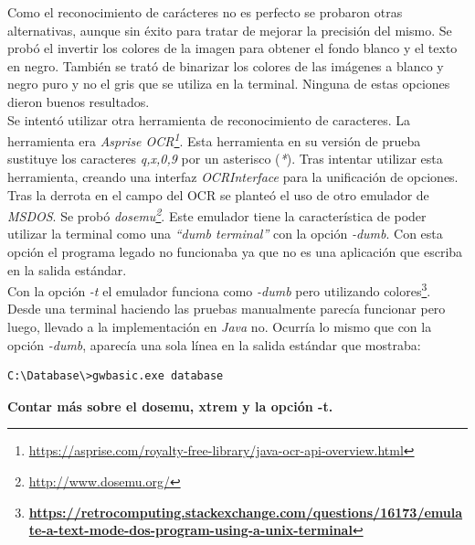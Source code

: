\documentclass[10pt,a4paper]{article}
\begin{document}
Como el reconocimiento de carácteres no es perfecto se probaron otras alternativas, aunque sin éxito para tratar de mejorar la precisión del mismo. Se probó el invertir los colores de la imagen para obtener el fondo blanco y el texto en negro. También se trató de binarizar los colores de las imágenes a blanco y negro puro y no el gris que se utiliza en la terminal. Ninguna de estas opciones dieron buenos resultados.\\
Se intentó utilizar otra herramienta de reconocimiento de caracteres. La herramienta era \emph{Asprise OCR\footnote{\url{https://asprise.com/royalty-free-library/java-ocr-api-overview.html}}}. Esta herramienta en su versión de prueba sustituye los caracteres \emph{q,x,0,9} por un asterisco (\emph{*}). Tras intentar utilizar esta herramienta, creando una interfaz \emph{OCRInterface} para la unificación de opciones.\\

Tras la derrota en el campo del OCR se planteó el uso de otro emulador de \emph{MSDOS}. Se probó \emph{dosemu\footnote{\url{http://www.dosemu.org/}}}. Este emulador tiene la característica de poder utilizar la terminal como una \emph{``dumb terminal''} con la opción \emph{-dumb}. Con esta opción el programa legado no funcionaba ya que no es una aplicación que escriba en la salida estándar.\\
Con la opción \emph{-t} el emulador funciona como \emph{-dumb} pero utilizando colores\footnote{\textbf{\url{https://retrocomputing.stackexchange.com/questions/16173/emulate-a-text-mode-dos-program-using-a-unix-terminal}}}. Desde una terminal haciendo las pruebas manualmente parecía funcionar pero luego, llevado a la implementación en \emph{Java} no. Ocurría lo mismo que con la opción \emph{-dumb}, aparecía una sola línea en la salida estándar que mostraba:

\begin{lstlisting}
C:\Database\>gwbasic.exe database
\end{lstlisting}


\textbf{Contar más sobre el dosemu, xtrem y la opción -t.}
\end{document}

